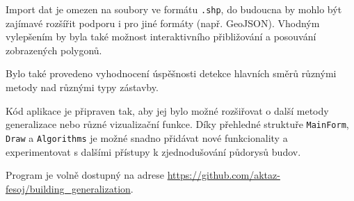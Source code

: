 \documentclass[a4paper,12pt]{article}
\begin{document}
Import dat je omezen na soubory ve formátu \texttt{.shp}, do budoucna by mohlo být zajímavé rozšířit podporu i pro jiné formáty (např. GeoJSON). Vhodným vylepšením by byla také možnost interaktivního přibližování a posouvání zobrazených polygonů.

Bylo také provedeno vyhodnocení úspěšnosti detekce hlavních směrů různými metody nad různými typy zástavby.

Kód aplikace je připraven tak, aby jej bylo možné rozšiřovat o další metody generalizace nebo různé vizualizační funkce. Díky přehledné struktuře \texttt{MainForm}, \texttt{Draw} a \texttt{Algorithms} je možné snadno přidávat nové funkcionality a experimentovat s dalšími přístupy k zjednodušování půdorysů budov.

Program je volně dostupný na adrese \href{https://github.com/aktaz-fesoj/building_generalization}{https://github.com/aktaz-fesoj/building\_generalization}.

\printbibliography[title={Zdroje}]
\end{document}
